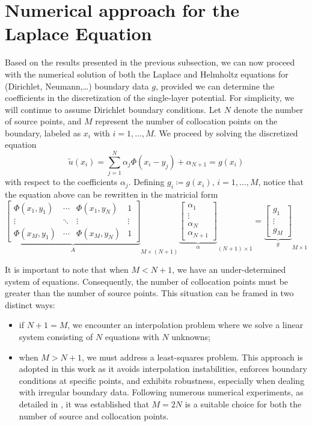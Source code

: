 \section{Numerical approach for the Laplace Equation}\label{n_a_MFS_lap}
Based on the results presented in the previous subsection, we can now proceed with the numerical solution of both the Laplace and Helmholtz equations for (Dirichlet, Neumann,\dots) boundary data \(g\), provided we can determine the coefficients in the discretization of the single-layer potential. For simplicity, we will continue to assume Dirichlet boundary conditions. Let \(N\) denote the number of source points, and \(M\) represent the number of collocation points on the boundary, labeled as \(x_i\) with \(i=1,\dots, M\). We proceed by solving the discretized equation
\[
    \tilde{u}(x_i) = \sum_{j=1}^{N} \alpha_j \Phi(x_i-y_j) + \alpha_{N+1} = g(x_i)    
\]
with respect to the coefficients \(\alpha_j\). Defining \(g_i \coloneq g(x_i), \, i=1,\dots, M\), notice that the equation above can be rewritten in the matricial form
\begin{equation}\label{MFS_m_system}
    {\underbrace{\begin{bmatrix}
        \Phi(x_1, y_1) & \cdots & \Phi(x_1, y_N) & 1 \\
        \vdots & \ddots & \vdots & \vdots\\
        \Phi(x_M, y_1) & \cdots & \Phi(x_M, y_N) & 1
    \end{bmatrix}}_{A}}_{M\times (N+1)}
    {\underbrace{\begin{bmatrix}
        \alpha_1\\
        \vdots\\
        \alpha_N\\
        \alpha_{N+1}
    \end{bmatrix}}_\alpha}_{(N+1)\times 1}
    =
    {\underbrace{\begin{bmatrix}
        g_1\\
        \vdots\\
        g_M
    \end{bmatrix}}_g}_{M\times 1}
\end{equation}

It is important to note that when \(M < N+1\), we have an under-determined system of equations. Consequently, the number of collocation points must be greater than the number of source points. This situation can be framed in two distinct ways:
\begin{itemize}
    \item if \(N+1=M\), we encounter an interpolation problem where we solve a linear system consisting of \(N\) equations with \(N\) unknowns;

    \item when \(M > N+1\), we must address a least-squares problem. This approach is adopted in this work as it avoids interpolation instabilities, enforces boundary conditions at specific points, and exhibits robustness, especially when dealing with irregular boundary data. Following numerous numerical experiments, as detailed in \cite{alves2009choice}, it was established that \(M=2N\) is a suitable choice for both the number of source and collocation points.
\end{itemize}

